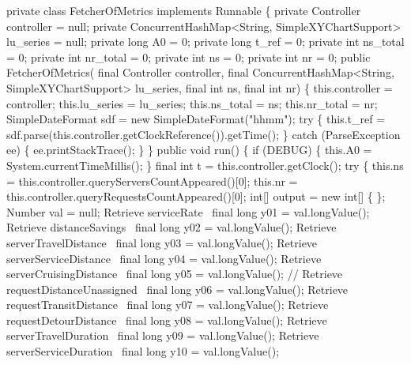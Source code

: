 \nwenddocs{}\plusendmoddef
private class FetcherOfMetrics implements Runnable \{
  private Controller controller = null;
  private ConcurrentHashMap<String, SimpleXYChartSupport> lu_series = null;
  private long A0 = 0;
  private long t_ref = 0;
  private int ns_total = 0;
  private int nr_total = 0;
  private int ns = 0;
  private int nr = 0;
  public FetcherOfMetrics(
      final Controller controller,
      final ConcurrentHashMap<String, SimpleXYChartSupport> lu_series,
      final int ns,
      final int nr) \{
    this.controller = controller;
    this.lu_series = lu_series;
    this.ns_total = ns;
    this.nr_total = nr;
    SimpleDateFormat sdf = new SimpleDateFormat("hhmm");
    try \{
      this.t_ref = sdf.parse(this.controller.getClockReference()).getTime();
    \} catch (ParseException ee) \{
      ee.printStackTrace();
    \}
  \}
  public void run() \{
    if (DEBUG) \{
      this.A0 = System.currentTimeMillis();
    \}
    final int t = this.controller.getClock();
    try \{
      this.ns = this.controller.queryServersCountAppeared()[0];
      this.nr = this.controller.queryRequestsCountAppeared()[0];
      int[] output = new int[] \{ \};
      Number val = null;
      \LA{}Retrieve serviceRate~{\nwtagstyle{}}\RA{}               final long y01 = val.longValue();
      \LA{}Retrieve distanceSavings~{\nwtagstyle{}}\RA{}           final long y02 = val.longValue();
      \LA{}Retrieve serverTravelDistance~{\nwtagstyle{}}\RA{}      final long y03 = val.longValue();
      \LA{}Retrieve serverServiceDistance~{\nwtagstyle{}}\RA{}     final long y04 = val.longValue();
      \LA{}Retrieve serverCruisingDistance~{\nwtagstyle{}}\RA{}    final long y05 = val.longValue();
//      \LA{}Retrieve requestDistanceUnassigned~{\nwtagstyle{}}\RA{} final long y06 = val.longValue();
      \LA{}Retrieve requestTransitDistance~{\nwtagstyle{}}\RA{}    final long y07 = val.longValue();
      \LA{}Retrieve requestDetourDistance~{\nwtagstyle{}}\RA{}     final long y08 = val.longValue();
      \LA{}Retrieve serverTravelDuration~{\nwtagstyle{}}\RA{}      final long y09 = val.longValue();
      \LA{}Retrieve serverServiceDuration~{\nwtagstyle{}}\RA{}     final long y10 = val.longValue();
